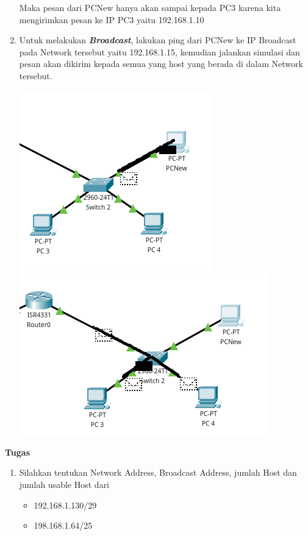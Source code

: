 \documentclass{article}
\begin{document}
\begin{flushleft}
\begin{enumerate}
            Maka pesan dari PCNew hanya akan sampai kepada PC3 karena kita mengirimkan pesan ke IP PC3 yaitu 192.168.1.10

            \item Untuk melakukan \textbf{\textit{Broadcast}}, lakukan ping dari PCNew ke IP Broadcast pada Network tersebut yaitu 192.168.1.15, kemudian jalankan simulasi dan pesan akan dikirim kepada semua yang host yang berada di dalam Network tersebut.
            
            \includegraphics[scale=0.55]{4-sim1.png}
            \includegraphics[scale=0.5]{4-sim3.png}
        \end{enumerate}
    \end{flushleft}

    \newpage
    \begin{flushleft}
        \textbf{Tugas}
        \newline

        \begin{enumerate}
            \item Silahkan tentukan Network Address, Broadcast Address, jumlah Host dan jumlah usable Host dari
            \begin{itemize}
                \item 192.168.1.130/29
                \item 198.168.1.64/25
            \end{itemize}
        \end{enumerate}
    \end{flushleft}
\end{document}
